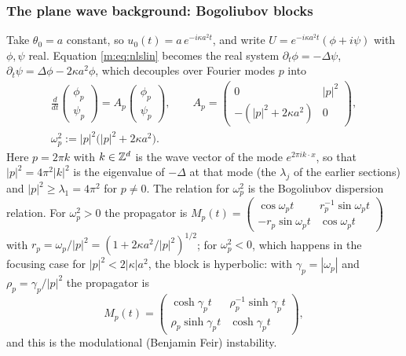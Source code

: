 \subsubsection{The plane wave background: Bogoliubov blocks} Take $\theta_0=a$ constant, so $u_0(t)=a\,e^{-i\kappa a^2t}$, and write $U=e^{-i\kappa a^2t}(\phi+i\psi)$ with $\phi,\psi$ real. Equation \eqref{m:eq:nlslin} becomes the real system $\partial_t\phi=-\Delta\psi$, $\partial_t\psi=\Delta\phi-2\kappa a^2\phi$, which decouples over Fourier modes $p$ into
\begin{equation}\label{m:eq:bog}
\begin{gathered}
\frac{d}{dt}\begin{pmatrix}\phi_p\\\psi_p\end{pmatrix}=A_p\begin{pmatrix}\phi_p\\\psi_p\end{pmatrix},\qquad A_p=\begin{pmatrix}0&|p|^2\\-(|p|^2+2\kappa a^2)&0\end{pmatrix},\\
\omega_p^2:=|p|^2\big(|p|^2+2\kappa a^2\big).
\end{gathered}
\end{equation}
Here $p=2\pi k$ with $k\in\mathbb{Z}^d$ is the wave vector of the mode $e^{2\pi ik\cdot x}$, so that $|p|^2=4\pi^2|k|^2$ is the eigenvalue of $-\Delta$ at that mode (the $\lambda_j$ of the earlier sections) and $|p|^2\ge\lambda_1=4\pi^2$ for $p\ne0$. The relation for $\omega_p^2$ is the Bogoliubov dispersion relation. For $\omega_p^2>0$ the propagator is $M_p(t)=\begin{pmatrix}\cos\omega_pt&r_p^{-1}\sin\omega_pt\\-r_p\sin\omega_pt&\cos\omega_pt\end{pmatrix}$ with $r_p=\omega_p/|p|^2=(1+2\kappa a^2/|p|^2)^{1/2}$; for $\omega_p^2<0$, which happens in the focusing case for $|p|^2<2|\kappa|a^2$, the block is hyperbolic: with $\gamma_p=|\omega_p|$ and $\rho_p=\gamma_p/|p|^2$ the propagator is
\[
M_p(t)=\begin{pmatrix}\cosh\gamma_pt&\rho_p^{-1}\sinh\gamma_pt\\\rho_p\sinh\gamma_pt&\cosh\gamma_pt\end{pmatrix},
\]
and this is the modulational (Benjamin Feir) instability.

